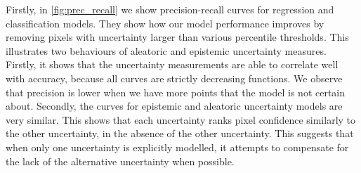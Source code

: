 Firstly, in \cref{fig:prec_recall} we show precision-recall curves for regression and classification models. They show how our model performance improves by removing pixels with uncertainty larger than various percentile thresholds. This illustrates two behaviours of aleatoric and epistemic uncertainty measures. Firstly, it shows that the uncertainty measurements are able to correlate well with accuracy, because all curves are strictly decreasing functions. We observe that precision is lower when we have more points that the model is not certain about. Secondly, the curves for epistemic and aleatoric uncertainty models are very similar. This shows that each uncertainty ranks pixel confidence similarly to the other uncertainty, in the absence of the other uncertainty.
This suggests that when only one uncertainty is explicitly modelled, it attempts to compensate for the lack of the alternative uncertainty when possible.

